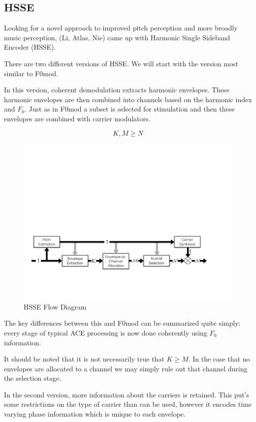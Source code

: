 \documentclass [11pt, proquest,oneside] {uwthesis}[2015/03/03]
\begin{document}
\subsection{HSSE}

Looking for a novel approach to improved pitch perception and more broadly music perception, (Li, Atlas, Nie) came up with Harmonic Single Sideband Encoder (HSSE).

There are two different versions of HSSE.  We will start with the version most similar to F0mod.

In this version, coherent demodulation extracts harmonic envelopes.  These harmonic envelopes are then combined into channels based on the harmonic index and $F_0$.  Just as in F0mod a subset is selected for stimulation and then these envelopes are combined with carrier modulators.

$$K, M \geq N$$

\begin{figure}[!ht]
  \centering
    \includegraphics[width=1\textwidth]{HSSE_flow_diagram_noPhase}   
    \caption{HSSE Flow Diagram}\label{fig:HSSE_flow_1}
\end{figure}

The key differences between this and F0mod can be summarized quite simply: every stage of typical ACE processing is now done coherently using $F_0$ information.

It should be noted that it is not necessarily true that $K \geq M$.  In the case that no envelopes are allocated to a channel we may simply rule out that channel during the selection stage.

In the second version, more information about the carriers is retained.  This put's some restrictions on the type of carrier than can be used, however it encodes time varying phase information which is unique to each envelope.
\end{document}
